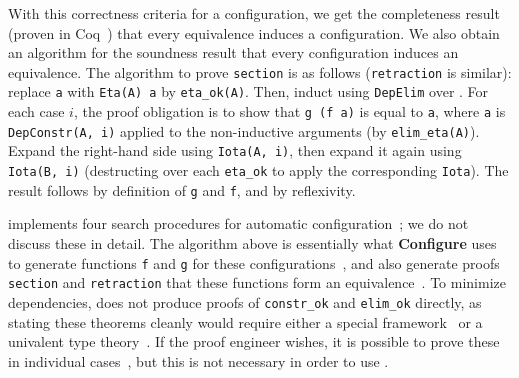 With this correctness criteria for a configuration, we get the completeness result (proven in Coq~\href{https://github.com/uwplse/pumpkin-pi/blob/silent/plugin/coq/playground/arbitrary.v}{}) that every equivalence induces a configuration. %
We also obtain an algorithm for the soundness result that every configuration induces an equivalence.
The algorithm to prove \lstinline{section} is as follows (\lstinline{retraction} is similar):
replace \lstinline{a} with \lstinline{Eta(A) a} by \lstinline{eta_ok(A)}.
Then, induct using \lstinline{DepElim} over \A.
For each case $i$, the proof obligation is to show that \lstinline{g (f a)} is equal to \lstinline{a},
where \lstinline{a} is \lstinline{DepConstr(A, i)} applied to the non-inductive arguments (by \lstinline{elim_eta(A)}).
Expand the right-hand side using \lstinline{Iota(A, i)}, then expand it again using \lstinline{Iota(B, i)}
(destructing over each \lstinline{eta_ok} to apply the corresponding \lstinline{Iota}).
The result follows by definition of \lstinline{g} and \lstinline{f}, and by reflexivity.

\toolname implements four search procedures for automatic configuration~\href{https://github.com/uwplse/pumpkin-pi/blob/silent/plugin/src/automation/lift/liftconfig.ml}{};
we do not discuss these in detail.
The algorithm above is essentially what \textbf{Configure} uses to generate functions \lstinline{f} and \lstinline{g} for these configurations~\href{https://github.com/uwplse/pumpkin-pi/blob/silent/plugin/src/automation/search/search.ml}{}, %
and also generate proofs \lstinline{section} and \lstinline{retraction} that these functions form an equivalence~\href{https://github.com/uwplse/pumpkin-pi/blob/silent/plugin/src/automation/search/equivalence.ml}{}. %
To minimize dependencies, \toolname does not produce proofs of \lstinline{constr_ok} and \lstinline{elim_ok} directly,
as stating these theorems cleanly would require either a special framework~\cite{tabareau2017equivalences}
or a univalent type theory~\cite{univalent2013homotopy}.
If the proof engineer wishes, it is possible to prove these in individual cases~\href{https://github.com/uwplse/pumpkin-pi/blob/silent/plugin/coq/playground/arbitrary.v}{}, %
but this is not necessary in order to use \toolname. %


